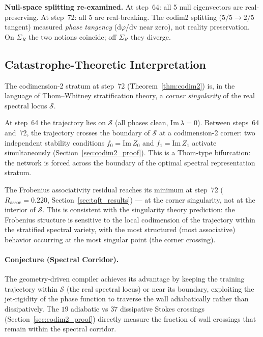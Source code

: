 \documentclass[11pt]{amsart}
\begin{document}
\textbf{Null-space splitting re-examined.}
At step~64: all 5 null eigenvectors are real-preserving.
At step~72: all 5 are real-breaking.
The codim2 splitting ($5/5 \to 2/5$ tangent) measured \emph{phase
tangency} (d$\varphi$/dv near zero), not reality preservation.
On $\Sigma_R$ the two notions coincide; off $\Sigma_R$ they diverge.


\subsection{Catastrophe-Theoretic Interpretation}

The codimension-2 stratum at step~72 (Theorem~\ref{thm:codim2}) is,
in the language of Thom--Whitney stratification theory, a
\emph{corner singularity} of the real spectral locus $\mathcal{S}$.

At step~64 the trajectory lies on $\mathcal{S}$ (all phases clean,
$\mathrm{Im}\,\lambda = 0$).
Between steps~64 and~72, the trajectory crosses the boundary of
$\mathcal{S}$ at a codimension-2 corner: two independent stability
conditions $f_0 = \mathrm{Im}\,Z_0$ and $f_1 = \mathrm{Im}\,Z_1$
activate simultaneously (Section~\ref{sec:codim2_proof}).
This is a Thom-type bifurcation: the network is forced across the
boundary of the optimal spectral representation stratum.

The Frobenius associativity residual reaches its minimum at step~72
($R_\mathrm{assoc} = 0.220$, Section~\ref{sec:tqft_results})
--- at the corner singularity, not at the interior of $\mathcal{S}$.
This is consistent with the singularity theory prediction:
the Frobenius structure is sensitive to the local codimension of the
trajectory within the stratified spectral variety, with the most
structured (most associative) behavior occurring at the most singular
point (the corner crossing).

\paragraph{Conjecture (Spectral Corridor).}
The geometry-driven compiler achieves its advantage by keeping the
training trajectory within $\mathcal{S}$ (the real spectral locus)
or near its boundary, exploiting the jet-rigidity of the phase function
to traverse the wall adiabatically rather than dissipatively.
The $19$ adiabatic vs $37$ dissipative Stokes crossings
(Section~\ref{sec:codim2_proof}) directly measure
the fraction of wall crossings that remain within the spectral corridor.
\end{document}

